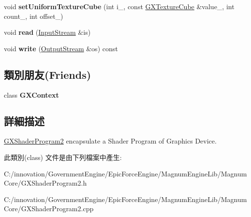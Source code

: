 \begin{DoxyCompactItemize}
\item 
void {\bfseries set\+Uniform\+Texture\+Cube} (int i\+\_\+, const \hyperlink{class_i_dream_sky_1_1_g_x_texture_cube}{G\+X\+Texture\+Cube} \&value\+\_\+, int count\+\_, int offset\+\_)\hypertarget{classi_dream_sky_1_1_g_x_shader_program2_a81e11573791045aa4c4a2f4feb53ec18}{}\label{classi_dream_sky_1_1_g_x_shader_program2_a81e11573791045aa4c4a2f4feb53ec18}

\item 
void {\bfseries read} (\hyperlink{class_i_dream_sky_1_1_input_stream}{Input\+Stream} \&is)\hypertarget{classi_dream_sky_1_1_g_x_shader_program2_aec1ae6026468cbfc6a7c0215f0f2a336}{}\label{classi_dream_sky_1_1_g_x_shader_program2_aec1ae6026468cbfc6a7c0215f0f2a336}

\item 
void {\bfseries write} (\hyperlink{class_i_dream_sky_1_1_output_stream}{Output\+Stream} \&os) const \hypertarget{classi_dream_sky_1_1_g_x_shader_program2_a212b7c960a7688a77be12b9766d31e56}{}\label{classi_dream_sky_1_1_g_x_shader_program2_a212b7c960a7688a77be12b9766d31e56}

\end{DoxyCompactItemize}
\subsection*{類別朋友(Friends)}
\begin{DoxyCompactItemize}
\item 
class {\bfseries G\+X\+Context}\hypertarget{classi_dream_sky_1_1_g_x_shader_program2_a2c36d7f8865080802bbad88cd73d871c}{}\label{classi_dream_sky_1_1_g_x_shader_program2_a2c36d7f8865080802bbad88cd73d871c}

\end{DoxyCompactItemize}


\subsection{詳細描述}
\hyperlink{classi_dream_sky_1_1_g_x_shader_program2}{G\+X\+Shader\+Program2} encapsulate a Shader Program of Graphics Device. 

此類別(class) 文件是由下列檔案中產生\+:\begin{DoxyCompactItemize}
\item 
C\+:/innovation/\+Government\+Engine/\+Epic\+Force\+Engine/\+Magnum\+Engine\+Lib/\+Magnum\+Core/G\+X\+Shader\+Program2.\+h\item 
C\+:/innovation/\+Government\+Engine/\+Epic\+Force\+Engine/\+Magnum\+Engine\+Lib/\+Magnum\+Core/G\+X\+Shader\+Program2.\+cpp\end{DoxyCompactItemize}
